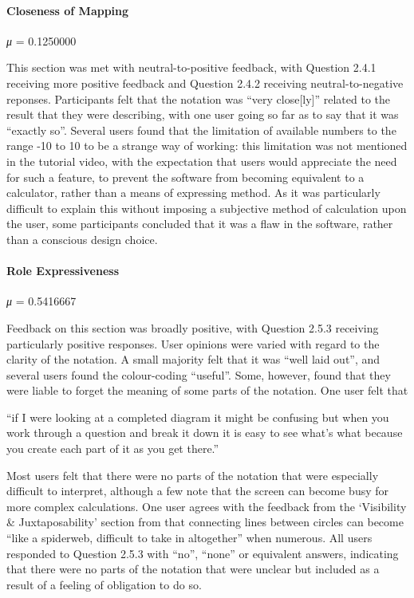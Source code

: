 \documentclass[12pt,twoside,notitlepage,xetex]{report}
\begin{document}
\paragraph{Closeness of Mapping}\hfill

\emph{μ} = 0.1250000

This section was met with neutral-to-positive feedback, with Question 2.4.1 receiving more positive feedback and Question 2.4.2 receiving neutral-to-negative reponses.  Participants felt that the notation was ``very close[ly]'' related to the result that they were describing, with one user going so far as to say that it was ``exactly so''.  Several users found that the limitation of available numbers to the range -10 to 10 to be a strange way of working: this limitation was not mentioned in the tutorial video, with the expectation that users would appreciate the need for such a feature, to prevent the software from becoming equivalent to a calculator, rather than a means of expressing method.  As it was particularly difficult to explain this without imposing a subjective method of calculation upon the user, some participants concluded that it was a flaw in the software, rather than a conscious design choice.

\paragraph{Role Expressiveness}\hfill

\emph{μ} = 0.5416667

Feedback on this section was broadly positive, with Question 2.5.3 receiving particularly positive responses.  User opinions were varied with regard to the clarity of the notation.  A small majority felt that it was ``well laid out'', and several users found the colour-coding ``useful''.  Some, however, found that they were liable to forget the meaning of some parts of the notation.  One user felt that
\begin{center}
\parbox[c]{\textwidth-2cm}{
\small
``if I were looking at a completed diagram it might be confusing but when you work through a question and break it down it is easy to see what's what because you create each part of it as you get there.''
}
\end{center}
Most users felt that there were no parts of the notation that were especially difficult to interpret, although a few note that the screen can become busy for more complex calculations.  One user agrees with the feedback from the `Visibility \& Juxtaposability' section from that connecting lines between circles can become ``like a spiderweb, difficult to take in altogether'' when numerous.  All users responded to Question 2.5.3 with ``no'', ``none'' or equivalent answers, indicating that there were no parts of the notation that were unclear but included as a result of a feeling of obligation to do so.
\end{document}
